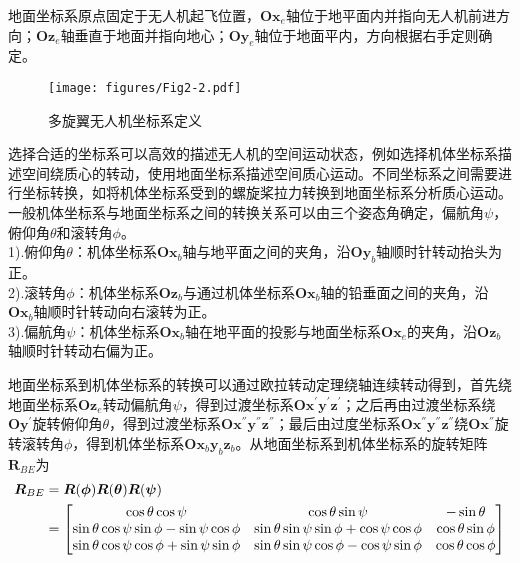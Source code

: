 地面坐标系原点固定于无人机起飞位置，$\boldsymbol{O} \boldsymbol{x}_e$轴位于地平面内并指向无人机前进方向；$\boldsymbol{O} \boldsymbol{z}_e$轴垂直于地面并指向地心；$\boldsymbol{O} \boldsymbol{y}_e$轴位于地面平内，方向根据右手定则确定。

\begin{figure}[h]
\centering
\texttt{[image: figures/Fig2-2.pdf]}
\caption{多旋翼无人机坐标系定义}
\label{fig2.2}
\end{figure}
\vspace{-20pt}

选择合适的坐标系可以高效的描述无人机的空间运动状态，例如选择机体坐标系描述空间绕质心的转动，使用地面坐标系描述空间质心运动。不同坐标系之间需要进行坐标转换，如将机体坐标系受到的螺旋桨拉力转换到地面坐标系分析质心运动。一般机体坐标系与地面坐标系之间的转换关系可以由三个姿态角确定，偏航角$\psi$，俯仰角$\theta$和滚转角$\phi$。\\
1).俯仰角$\theta$：机体坐标系$\boldsymbol{O} \boldsymbol{x}_b$轴与地平面之间的夹角，沿$\boldsymbol{O} \boldsymbol{y}_b$轴顺时针转动抬头为正。\\
2).滚转角$\phi$：机体坐标系$\boldsymbol{O} \boldsymbol{z}_b$与通过机体坐标系$\boldsymbol{O} \boldsymbol{x}_b$轴的铅垂面之间的夹角，沿$\boldsymbol{O} \boldsymbol{x}_b$轴顺时针转动向右滚转为正。\\
3).偏航角$\psi$：机体坐标系$\boldsymbol{O} \boldsymbol{x}_b$轴在地平面的投影与地面坐标系$\boldsymbol{O} \boldsymbol{x}_e$的夹角，沿$\boldsymbol{O} \boldsymbol{z}_b$轴顺时针转动右偏为正。

地面坐标系到机体坐标系的转换可以通过欧拉转动定理绕轴连续转动得到，首先绕地面坐标系$\boldsymbol{O} \boldsymbol{z}_e$转动偏航角$\psi$，得到过渡坐标系$\boldsymbol{O} \boldsymbol{x}^{'} \boldsymbol{y}^{'} \boldsymbol{z}^{'}$；之后再由过渡坐标系绕$\boldsymbol{O} \boldsymbol{y}^{'}$旋转俯仰角$\theta$，得到过渡坐标系$\boldsymbol{O} \boldsymbol{x}^{''} \boldsymbol{y}^{''} \boldsymbol{z}^{''}$；最后由过度坐标系$\boldsymbol{O} \boldsymbol{x}^{''} \boldsymbol{y}^{''} \boldsymbol{z}^{''}$绕$\boldsymbol{O} \boldsymbol{x}^{''}$旋转滚转角$\phi$，得到机体坐标系$\boldsymbol{O} \boldsymbol{x}_b \boldsymbol{y}_b \boldsymbol{z}_b$。从地面坐标系到机体坐标系的旋转矩阵$\boldsymbol{R}_{BE}$为
\begin{equation}
\label{equ2.1}
\begin{aligned}
\boldsymbol{R}_{BE} 
&= \boldsymbol{R}(\boldsymbol{\phi}) \boldsymbol{R}(\boldsymbol{\theta}) \boldsymbol{R}(\boldsymbol{\psi}) \\ 
&= 
\begin{bmatrix}
\cos\theta \cos\psi & \cos\theta \sin\psi & -\sin\theta \cr
\sin\theta \cos\psi \sin\phi - \sin\psi \cos\phi & \sin\theta \sin\psi \sin\phi + \cos\psi \cos\phi & \cos\theta \sin\phi \cr
\sin\theta \cos\psi \cos\phi + \sin\psi \sin\phi & \sin\theta \sin\psi \cos\phi - \cos\psi \sin\phi & \cos\theta \cos\phi \cr
\end{bmatrix}
\end{aligned}
\end{equation}


